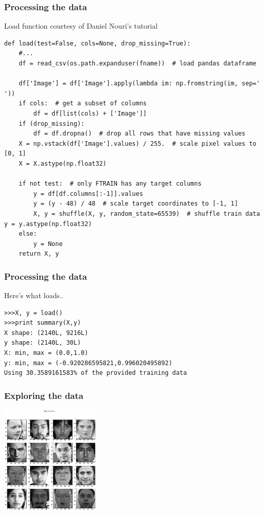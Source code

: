 \documentclass{beamer}
\begin{document}
\begin{frame}[fragile]
\frametitle{Processing the data}
\begin{block}{Load function courtesy of Daniel Nouri's tutorial}
\begin{verbatim}
def load(test=False, cols=None, drop_missing=True):
    #...
    df = read_csv(os.path.expanduser(fname))  # load pandas dataframe

    df['Image'] = df['Image'].apply(lambda im: np.fromstring(im, sep=' '))
    if cols:  # get a subset of columns
        df = df[list(cols) + ['Image']]
    if (drop_missing):
        df = df.dropna()  # drop all rows that have missing values
    X = np.vstack(df['Image'].values) / 255.  # scale pixel values to [0, 1]
    X = X.astype(np.float32)

    if not test:  # only FTRAIN has any target columns
        y = df[df.columns[:-1]].values
        y = (y - 48) / 48  # scale target coordinates to [-1, 1]
        X, y = shuffle(X, y, random_state=65539)  # shuffle train data          y = y.astype(np.float32)
    else:
        y = None
    return X, y\end{verbatim}
\end{block}
\end{frame}

\begin{frame}[fragile]
\frametitle{Processing the data}
\begin{block}{Here's what loads..}
\begin{verbatim}
>>>X, y = load()
>>>print summary(X,y)
X shape: (2140L, 9216L)
y shape: (2140L, 30L)
X: min, max = (0.0,1.0)
y: min, max = (-0.920286595821,0.996020495892)
Using 30.3589161583% of the provided training data
\end{verbatim}
\end{block}
\end{frame}
\begin{frame}[fragile]
\frametitle{Exploring the data}
\includegraphics[width=180px]{fk_face.png}
\end{frame}
\end{document}
